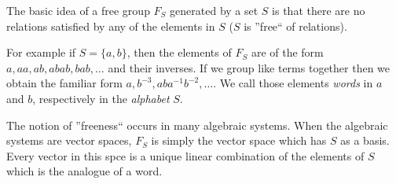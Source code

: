 The basic idea of a free group \(F_S\) generated by a set \(S\) is that there are no relations satisfied by any of the elements in \(S\) (\(S\) is ''free`` of relations).

For example if \(S = \{a, b\}\), then the elements of \(F_S\) are of the form \(a, aa, ab, abab, bab, \ldots\) and their inverses.
If we group like terms together then we obtain the familiar form \(a, b^{-3}, aba^{-1}b^{-2}, \ldots\).
We call those elements \emph{words} in \(a\) and \(b\), respectively in the \emph{alphabet} \(S\).

The notion of ''freeness`` occurs in many algebraic systems.
When the algebraic systems are vector spaces, \(F_S\) is simply the vector space which has \(S\) as a basis.
Every vector in this spce is a unique linear combination of the elements of \(S\) which is the analogue of a word.

